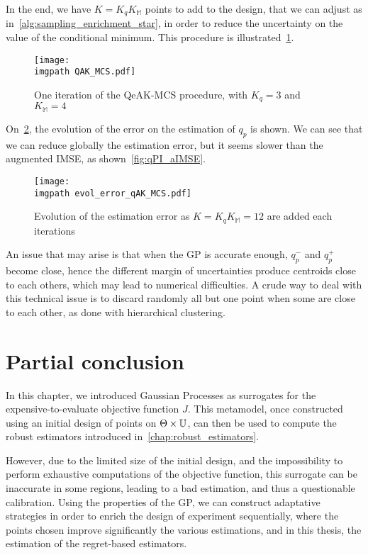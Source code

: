 \documentclass[../../Main_ManuscritThese.tex]{subfiles}
\newcommand\imgpath{/home/victor/acadwriting/Manuscrit/Text/Chapter4/img/}
\begin{document}
In the end, we have $K = K_qK_{\mathbb{M}}$ points to add to the
design, that we can adjust as in~\cref{alg:sampling_enrichment_star},
in order to reduce the uncertainty on the value of the conditional
minimum. This procedure is illustrated~\cref{fig:QAK_MCS}.
\begin{figure}[ht]
  \centering
  \texttt{[image: \\imgpath QAK\_MCS.pdf]}
  \caption{\label{fig:QAK_MCS} One iteration of the QeAK-MCS procedure, with $K_q=3$ and $K_{\mathbb{M}}=4$}
\end{figure}
On~\cref{fig:evol_error_qAK_MCS}, the evolution of the error on the
estimation of $q_p$ is shown. We can see that we can reduce globally
the estimation error, but it seems slower than the augmented IMSE, as
shown~\cref{fig:qPI_aIMSE}.
\begin{figure}[ht]
  \centering
  \texttt{[image: \\imgpath evol\_error\_qAK\_MCS.pdf]}
  \caption{\label{fig:evol_error_qAK_MCS} Evolution of the estimation
    error as $K=K_qK_{\mathbb{M}}=12$ are added each iterations}
\end{figure}

An issue that may arise is that when the GP is accurate enough,
$q_p^-$ and $q_p^+$ become close, hence the different margin of
uncertainties produce centroids close to each others, which may lead
to numerical difficulties. A crude way to deal with this technical
issue is to discard randomly all but one point when some are close to
each other, as done with hierarchical clustering.

\section{Partial conclusion}

In this chapter, we introduced Gaussian Processes as surrogates for
the expensive-to-evaluate objective function $J$. This metamodel, once
constructed using an initial design of points on
$\Theta \times \mathbb{U}$, can then be used to compute the robust
estimators introduced in~\cref{chap:robust_estimators}.

However, due to the limited size of the initial design, and the
impossibility to perform exhaustive computations of the objective
function, this surrogate can be inaccurate in some regions, leading to
a bad estimation, and thus a questionable calibration.  Using the
properties of the GP, we can construct adaptative strategies in order
to enrich the design of experiment sequentially, where the points
chosen improve significantly the various estimations, and in this
thesis, the estimation of the regret-based estimators.
\end{document}
